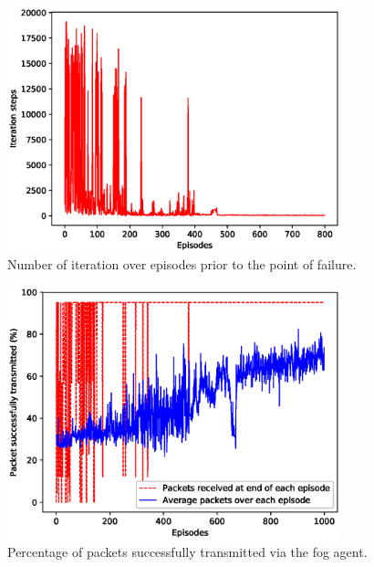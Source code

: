 \documentclass[journal]{IEEEtran}
\begin{document}
\begin{figure}[!t]
\centering
\includegraphics[width=3.8in]{num_iter.eps}
\caption{Number of iteration over episodes prior to the point of failure.}
\label{num_iter}
\end{figure}


\begin{figure}[!t]
\centering
\includegraphics[width=3.8in]{pckt_sent.eps}
\caption{Percentage of packets successfully transmitted via the fog agent.}
\label{pckt_sent}
\end{figure}
\end{document}
